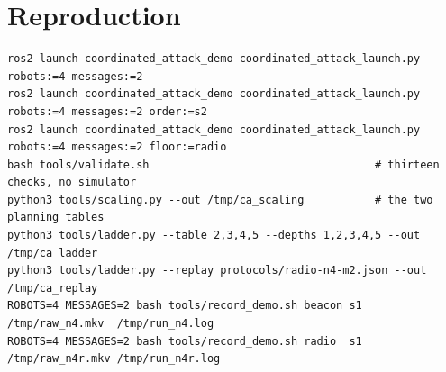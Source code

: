\documentclass[11pt,a4paper]{article}
\theoremstyle{definition}
\begin{document}
\section*{Reproduction}

\begin{lstlisting}
ros2 launch coordinated_attack_demo coordinated_attack_launch.py robots:=4 messages:=2
ros2 launch coordinated_attack_demo coordinated_attack_launch.py robots:=4 messages:=2 order:=s2
ros2 launch coordinated_attack_demo coordinated_attack_launch.py robots:=4 messages:=2 floor:=radio
bash tools/validate.sh                                   # thirteen checks, no simulator
python3 tools/scaling.py --out /tmp/ca_scaling           # the two planning tables
python3 tools/ladder.py --table 2,3,4,5 --depths 1,2,3,4,5 --out /tmp/ca_ladder
python3 tools/ladder.py --replay protocols/radio-n4-m2.json --out /tmp/ca_replay
ROBOTS=4 MESSAGES=2 bash tools/record_demo.sh beacon s1 /tmp/raw_n4.mkv  /tmp/run_n4.log
ROBOTS=4 MESSAGES=2 bash tools/record_demo.sh radio  s1 /tmp/raw_n4r.mkv /tmp/run_n4r.log
\end{lstlisting}
\end{document}
